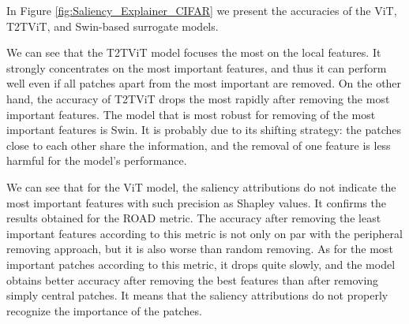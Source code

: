 \documentclass[magisterska,en]{pracamgr}
\begin{document}
In Figure \ref{fig:Saliency_Explainer_CIFAR} we present the accuracies of the ViT, T2T\textunderscore ViT, and Swin-based surrogate models.





We can see that the T2T\textunderscore ViT model focuses the most on the local features. It strongly concentrates on the most important features, and thus it can perform well even if all patches apart from the most important are removed. On the other hand, the accuracy of T2T\textunderscore ViT drops the most rapidly after removing the most important features. The model that is most robust for removing of the most important features is Swin. It is probably due to its shifting strategy: the patches close to each other share the information, and the removal of one feature is less harmful for the model's performance.

We can see that for the ViT model, the saliency attributions do not indicate the most important features with such precision as Shapley values. It confirms the results obtained for the ROAD metric. The accuracy after removing the least important features according to this metric is not only on par with the peripheral removing approach, but it is also worse than random removing. As for the most important patches according to this metric, it drops quite slowly, and the model obtains better accuracy after removing the best features than after removing simply central patches. It means that the saliency attributions do not properly recognize the importance of the patches.

\iftrue
\end{document}

